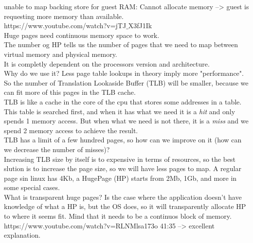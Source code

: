 \documentclass[11pt, a4paper, oneside]{article}
\theoremstyle{definition}
\begin{document}
unable to map backing store for guest RAM: Cannot allocate memory --> guest is requesting more memory than available. \\

https://www.youtube.com/watch?v=jTJ$\_$X3fJ1Ik\\
Huge pages need continuous memory space to work.\\
The number og HP tells us the number of pages that we need to map between virtual memory and physical memory.\\
It is completly dependent on the processors version and architecture.\\
Why do we use it? Less page table lookups in theory imply more "performance". So the number of Translation Lookaside Buffer (TLB) will be smaller, because we can fit more of this pages in the TLB cache. \\
TLB is like a cache in the core of the cpu that stores some addresses in a table. This table is searched first, and when it has what we need it is a \textit{hit} and only spends 1 memory access. But when what we need is not there, it is a \textit{miss} and we spend 2 memory access to achieve the result. \\
TLB has a limit of a few hundred pages, so how can we improve on it (how can we decrease the number of misses)?\\
Increasing TLB size by itself is to expensive in terms of resources, so the best slution is to increase the page size, so we will have less pages to map. A regular page sin linux has 4Kb, a HugePage (HP) starts from 2Mb, 1Gb, and more in some special cases.\\

What is transparent huge pages? Is the case where the application doesn't have knowledge of what a HP is, but the OS does, so it will transparently allocate HP to where it seems fit. Mind that it needs to be a continuos block of memory.\\
https://www.youtube.com/watch?v=RLNMlsa173o 41:35 --> excellent explanation.\\

\end{document}
